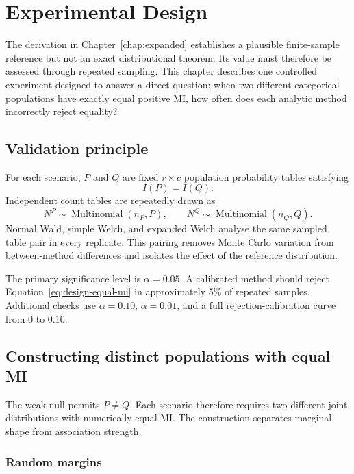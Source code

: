 \chapter{Experimental Design}
\label{chap:design}

The derivation in Chapter~\ref{chap:expanded} establishes a plausible
finite-sample reference but not an exact distributional theorem. Its value
must therefore be assessed through repeated sampling. This chapter describes
one controlled experiment designed to answer a direct question: when two
different categorical populations have exactly equal positive MI, how often
does each analytic method incorrectly reject equality?

\section{Validation principle}

For each scenario, \(P\) and \(Q\) are fixed \(r\times c\) population
probability tables satisfying
\begin{equation}
  I(P)=I(Q).
  \label{eq:design-equal-mi}
\end{equation}
Independent count tables are repeatedly drawn as
\begin{equation}
  N^{P}\sim\operatorname{Multinomial}(n_P,P),
  \qquad
  N^{Q}\sim\operatorname{Multinomial}(n_Q,Q).
  \label{eq:design-multinomial}
\end{equation}
Normal Wald, simple Welch, and expanded Welch analyse the same sampled table
pair in every replicate. This pairing removes Monte Carlo variation from
between-method differences and isolates the effect of the reference
distribution.

The primary significance level is \(\alpha=0.05\). A calibrated method should
reject Equation~\eqref{eq:design-equal-mi} in approximately 5\% of repeated
samples. Additional checks use \(\alpha=0.10\), \(\alpha=0.01\), and a full
rejection-calibration curve from 0 to 0.10.

\section{Constructing distinct populations with equal MI}

The weak null permits \(P\ne Q\). Each scenario therefore requires two
different joint distributions with numerically equal MI. The construction
separates marginal shape from association strength.

\subsection{Random margins}

